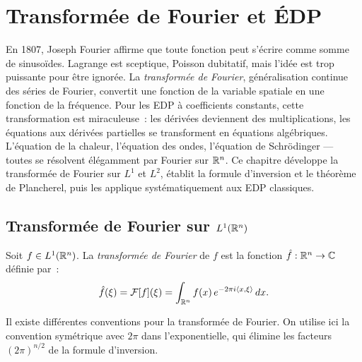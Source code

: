 \chapter{Transform\'ee de Fourier et \'EDP}
\label{ch:transformee_fourier}

En 1807, Joseph Fourier affirme que toute fonction peut s'\'ecrire comme somme de sinuso\"ides. Lagrange est sceptique, Poisson dubitatif, mais l'id\'ee est trop puissante pour \^etre ignor\'ee. La \emph{transform\'ee de Fourier}, g\'en\'eralisation continue des s\'eries de Fourier, convertit une fonction de la variable spatiale en une fonction de la fr\'equence. Pour les EDP \`a coefficients constants, cette transformation est miraculeuse~: les d\'eriv\'ees deviennent des multiplications, les \'equations aux d\'eriv\'ees partielles se transforment en \'equations alg\'ebriques. L'\'equation de la chaleur, l'\'equation des ondes, l'\'equation de Schr\"odinger --- toutes se r\'esolvent \'el\'egamment par Fourier sur $\mathbb{R}^n$. Ce chapitre d\'eveloppe la transform\'ee de Fourier sur $L^1$ et $L^2$, \'etablit la formule d'inversion et le th\'eor\`eme de Plancherel, puis les applique syst\'ematiquement aux EDP classiques.

\section{Transform\'ee de Fourier sur $L^1(\mathbb{R}^n)$}

\begin{definition}
Soit $f \in L^1(\mathbb{R}^n)$. La \emph{transform\'ee de Fourier} de $f$ est la fonction
$\hat{f} : \mathbb{R}^n \to \mathbb{C}$ d\'efinie par~:
\[
    \hat{f}(\xi) = \mathcal{F}[f](\xi) = \int_{\mathbb{R}^n} f(x)\, e^{-2\pi i \langle x, \xi \rangle} \, dx.
\]
\end{definition}

\begin{remarque}
Il existe diff\'erentes conventions pour la transform\'ee de Fourier. On utilise ici
la convention sym\'etrique avec $2\pi$ dans l'exponentielle, qui \'elimine les facteurs
$(2\pi)^{n/2}$ de la formule d'inversion.
\end{remarque}

